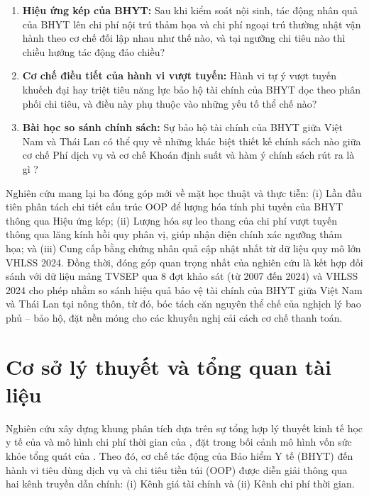 \documentclass[12pt,a4paper]{article}
\begin{document}
\begin{enumerate}
	\item \textbf{Hiệu ứng kép của BHYT:} Sau khi kiểm soát nội sinh, tác động nhân quả 
	của BHYT lên chi phí nội trú thảm họa và chi phí ngoại trú thường nhật vận hành 
	theo cơ chế đối lập nhau như thế nào, và tại ngưỡng chi tiêu nào thì chiều hướng 
	tác động đảo chiều?
	
	\item \textbf{Cơ chế điều tiết của hành vi vượt tuyến:} Hành vi tự ý vượt tuyến 
	khuếch đại hay triệt tiêu năng lực bảo hộ tài chính của BHYT dọc theo phân phối 
	chi tiêu, và điều này phụ thuộc vào những yếu tố thể chế nào?
	
	\item \textbf{Bài học so sánh chính sách:} Sự bảo hộ tài chính của BHYT giữa Việt Nam và Thái Lan 
	có thể quy về những khác biệt thiết kế chính sách nào giữa cơ chế Phí dịch vụ và cơ chế Khoán định suất và hàm ý chính sách rút ra là gì \parencite{feldstein2011}?
\end{enumerate}

Nghiên cứu mang lại ba đóng góp mới về mặt học thuật và thực tiễn: (i) Lần đầu tiên phân tách chi tiết cấu trúc OOP để lượng hóa tính phi tuyến của BHYT thông qua Hiệu ứng kép; (ii) Lượng hóa sự leo thang của chi phí vượt tuyến thông qua lăng kính hồi quy phân vị, giúp nhận diện chính xác ngưỡng thảm họa; và (iii) Cung cấp bằng chứng nhân quả cập nhật nhất từ dữ liệu quy mô lớn VHLSS 2024. Đồng thời, đóng góp quan trọng nhất của nghiên cứu là kết hợp đối sánh với dữ liệu mảng TVSEP qua 8 đợt khảo sát (từ 2007 đến 2024) và VHLSS 2024 cho phép nhằm so sánh hiệu quả bảo vệ tài chính của BHYT giữa Việt Nam và Thái Lan tại nông thôn, từ đó, bóc tách căn nguyên thể chế của nghịch lý bao phủ -- bảo hộ, đặt nền móng cho các khuyến nghị cải cách cơ chế thanh toán.

\section{Cơ sở lý thuyết và tổng quan tài liệu}

Nghiên cứu xây dựng khung phân tích dựa trên sự tổng hợp lý thuyết kinh tế học y tế của \textcite{folland2024} và mô hình chi phí thời gian của \textcite{sarkodie2022}, đặt trong bối cảnh mô hình vốn sức khỏe tổng quát của \textcite{grossman1972}. Theo đó, cơ chế tác động của Bảo hiểm Y tế (BHYT) đến hành vi tiêu dùng dịch vụ và chi tiêu tiền túi (OOP) được diễn giải thông qua hai kênh truyền dẫn chính: (i) Kênh giá tài chính và (ii) Kênh chi phí thời gian.
\end{document}
